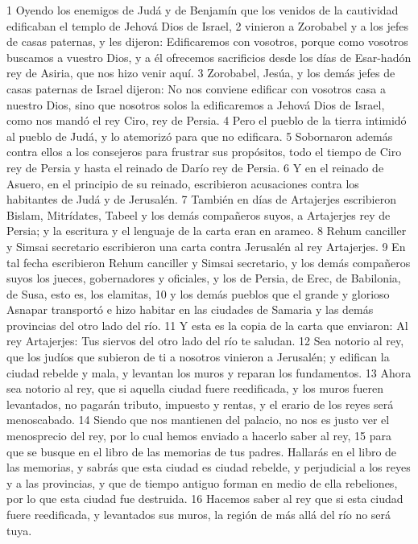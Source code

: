 1 Oyendo los enemigos de Judá y de Benjamín que los venidos de la cautividad edificaban el templo de Jehová Dios de Israel,
2 vinieron a Zorobabel y a los jefes de casas paternas, y les dijeron: Edificaremos con vosotros, porque como vosotros buscamos a vuestro Dios, y a él ofrecemos sacrificios desde los días de Esar-hadón rey de Asiria, que nos hizo venir aquí. 
3 Zorobabel, Jesúa, y los demás jefes de casas paternas de Israel dijeron: No nos conviene edificar con vosotros casa a nuestro Dios, sino que nosotros solos la edificaremos a Jehová Dios de Israel, como nos mandó el rey Ciro, rey de Persia.
4 Pero el pueblo de la tierra intimidó al pueblo de Judá, y lo atemorizó para que no edificara.
5 Sobornaron además contra ellos a los consejeros para frustrar sus propósitos, todo el tiempo de Ciro rey de Persia y hasta el reinado de Darío rey de Persia.
6 Y en el reinado de Asuero, en el principio de su reinado, escribieron acusaciones contra los habitantes de Judá y de Jerusalén.
7 También en días de Artajerjes escribieron Bislam, Mitrídates, Tabeel y los demás compañeros suyos, a Artajerjes rey de Persia; y la escritura y el lenguaje de la carta eran en arameo.
8 Rehum canciller y Simsai secretario escribieron una carta contra Jerusalén al rey Artajerjes.
9 En tal fecha escribieron Rehum canciller y Simsai secretario, y los demás compañeros suyos los jueces, gobernadores y oficiales, y los de Persia, de Erec, de Babilonia, de Susa, esto es, los elamitas,
10 y los demás pueblos que el grande y glorioso Asnapar transportó e hizo habitar en las ciudades de Samaria y las demás provincias del otro lado del río.
11 Y esta es la copia de la carta que enviaron: Al rey Artajerjes: Tus siervos del otro lado del río te saludan.
12 Sea notorio al rey, que los judíos que subieron de ti a nosotros vinieron a Jerusalén; y edifican la ciudad rebelde y mala, y levantan los muros y reparan los fundamentos.
13 Ahora sea notorio al rey, que si aquella ciudad fuere reedificada, y los muros fueren levantados, no pagarán tributo, impuesto y rentas, y el erario de los reyes será menoscabado.
14 Siendo que nos mantienen del palacio, no nos es justo ver el menosprecio del rey, por lo cual hemos enviado a hacerlo saber al rey,
15 para que se busque en el libro de las memorias de tus padres. Hallarás en el libro de las memorias, y sabrás que esta ciudad es ciudad rebelde, y perjudicial a los reyes y a las provincias, y que de tiempo antiguo forman en medio de ella rebeliones, por lo que esta ciudad fue destruida.
16 Hacemos saber al rey que si esta ciudad fuere reedificada, y levantados sus muros, la región de más allá del río no será tuya. 
